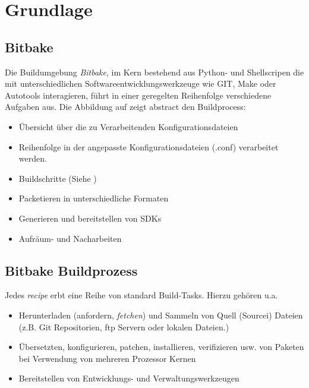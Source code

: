 

\chapter{Grundlage}%
\label{cha:grundlagen}

\section{Bitbake }%
\label{sec:bitbake_buildprozess}



Die Buildumgebung \textit{Bitbake}, im Kern bestehend aus Python- und
Shellscripen die mit unterschiedlichen Softwareentwicklungs\-werkzeuge wie GIT,
Make oder Autotools interagieren, führt in einer geregelten Reihenfolge verschiedene
Aufgaben aus. Die Abbildung auf \cite[S. 20]{Gonzalez2018:Embedded_Linux_Development_Using_Yocto_Project_Cookbook_2nd}
zeigt abstract den Build\-process:

\begin{itemize}
    \item Übersicht über die zu Verarbeitenden Konfigurationsdateien
    \item Reihenfolge in der angepasste Konfigurationsdateien (.conf)
        verarbeitet werden.
    \item Buildschritte (Siehe )
    \item Packetieren in unterschiedliche Formaten
    \item Generieren und bereitstellen von \aclp{SDK}
    \item Aufräum- und Nacharbeiten
\end{itemize}

\section{Bitbake Buildprozess}%
\label{sec:bitbake_build_tasks}

Jedes \textit{recipe} erbt eine Reihe von standard Build-Tasks. Hierzu
gehören u.a.
\begin{itemize}
    \item Herunterladen (anfordern, \textit{fetchen}) und Sammeln von Quell
        (Sourcei) Dateien (z.B. Git Repositorien, ftp Servern oder lokalen
        Dateien.) \item Übersetzten, konfigurieren, patchen, installieren,
        verifizieren usw.  von Paketen bei Verwendung von mehreren Prozessor
        Kernen \item Bereitstellen von Entwicklungs- und Verwaltungswerkzeugen
\end{itemize}

